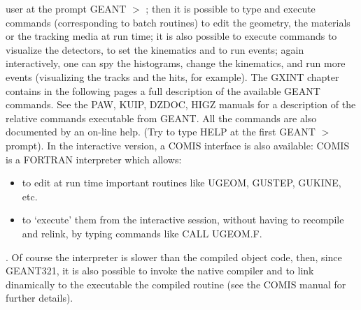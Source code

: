 user at the prompt GEANT $>$ ; then it is possible to type and execute 
commands (corresponding to batch routines) to edit the geometry, the materials
or the tracking media at run time; it is also possible to execute commands
to visualize the detectors, to set the kinematics and to run events; again
interactively, one can spy the histograms, change the kinematics, and run
more events (visualizing the tracks and the hits, for example). The GXINT
chapter contains in the following pages a full description of the available
GEANT commands. See the PAW, KUIP, DZDOC, HIGZ manuals for a description of
the relative commands executable from GEANT. All the commands are also
documented by an on-line help. (Try to type HELP at the first GEANT $>$ prompt).
In the interactive version, a COMIS interface is also available: COMIS is a
FORTRAN interpreter which allows:
\begin{itemize}
\item to edit at run time important routines like UGEOM, GUSTEP, GUKINE, etc.
\item to `execute' them from the interactive session, without having to 
      recompile and relink, by typing commands like CALL UGEOM.F.
\end{itemize}.
Of course the interpreter is slower than the compiled object code,
then, since GEANT321, it is also possible to invoke the native compiler and
to link dinamically to the executable the compiled routine (see the COMIS 
manual for further details).











   


   









